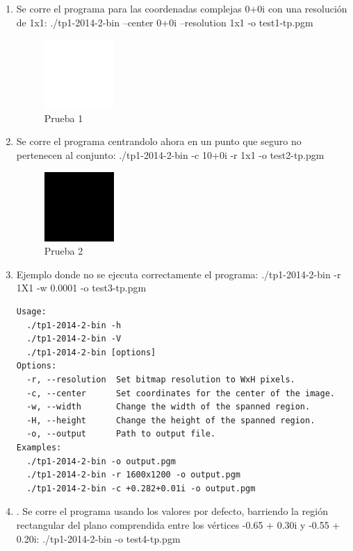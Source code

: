 \documentclass[10pt,spanish,a4paper,openany,notitlepage]{article}
\begin{document}
\begin{enumerate}
\item Se corre el programa para las coordenadas complejas 0+0i con una resolución de 1x1:   ./tp1-2014-2-bin --center 0+0i --resolution 1x1 -o test1-tp.pgm 
\begin{figure}[hbt]
\centering
\includegraphics[width=0.25\textwidth]{test1-tp.jpg}
\caption{Prueba 1}
\end{figure}
\item Se corre el programa centrandolo ahora en un punto que seguro no pertenecen al conjunto:  ./tp1-2014-2-bin -c 10+0i -r 1x1 -o test2-tp.pgm
\begin{figure}[hbt]
\centering
\includegraphics[width=0.25\textwidth]{test2-tp.jpg}
\caption{Prueba 2}
\end{figure}
\item Ejemplo donde no se ejecuta correctamente el programa:  ./tp1-2014-2-bin -r 1X1 -w 0.0001 -o test3-tp.pgm 
\begin{framed}
\begin{verbatim}Usage: 
  ./tp1-2014-2-bin -h 
  ./tp1-2014-2-bin -V 
  ./tp1-2014-2-bin [options] 
Options: 
  -r, --resolution  Set bitmap resolution to WxH pixels. 
  -c, --center      Set coordinates for the center of the image. 
  -w, --width       Change the width of the spanned region. 
  -H, --height      Change the height of the spanned region. 
  -o, --output      Path to output file. 
Examples: 
  ./tp1-2014-2-bin -o output.pgm 
  ./tp1-2014-2-bin -r 1600x1200 -o output.pgm 
  ./tp1-2014-2-bin -c +0.282+0.01i -o output.pgm \end{verbatim}
\end{framed}
\item. Se corre el programa usando los valores por defecto, barriendo la región rectangular del plano comprendida entre los vértices -0.65 + 0.30i y -0.55 + 0.20i:  ./tp1-2014-2-bin -o test4-tp.pgm

\end{enumerate}
\end{document}
